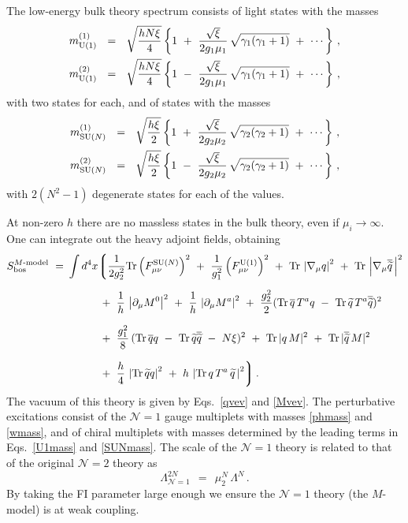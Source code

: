 \documentclass[12pt]{article}
\def\beq{\begin{equation}}
\def\eeq{\end{equation}}
\def\Tr{{\rm Tr}}
\newcommand{\ntwo}{${\mathcal N}=2$ }
\newcommand{\none}{${\mathcal N}=1$ }
\newcommand{\p}{\partial}
\newcommand{\wt}{\widetilde}
\newcommand{\ov}{\overline}
\newcommand{\mc}[1]{\mathcal{#1}}
\begin{document}
	The low-energy bulk theory spectrum consists of light states with the masses
\begin{align}
\label{U1mass}
%
\notag
	m_\text{U(1)}^{(1)}  ~~=~~ \sqrt{\frac{h N\xi}{4}}
		\left\{  1 ~+~ \frac{\sqrt{\xi}}{2g_1\mu_1}\,\sqrt{\gamma_1 (\gamma_1 + 1)} 
				~+~ \cdots \right\}\,,	
	\\
%
	m_\text{U(1)}^{(2)}  ~~=~~ \sqrt{\frac{h N\xi}{4}}
		\left\{  1 ~-~ \frac{\sqrt{\xi}}{2g_1\mu_1}\,\sqrt{\gamma_1 (\gamma_1 + 1)}
				~+~ \cdots \right\}\,,
\end{align}
	with two states for each, and of states with the masses
\begin{align}
\label{SUNmass}
%
\notag
	m_\text{SU($N$)}^{(1)} ~~=~~ \sqrt{\frac{h\xi}{2}}
		\left\{ 1 ~+~ \frac{\sqrt{\xi}}{2 g_2\mu_2}\,\sqrt{\gamma_2 (\gamma_2 + 1)}
				~+~ \cdots \right\}\,,
	\\
%
	m_\text{SU($N$)}^{(2)} ~~=~~ \sqrt{\frac{h\xi}{2}}
		\left\{ 1 ~-~ \frac{\sqrt{\xi}}{2 g_2\mu_2}\,\sqrt{\gamma_2 (\gamma_2 + 1)}
				~+~ \cdots \right\}\,,
\end{align}
	with $ 2 (N^2 - 1) $ degenerate states for each of the values.

	At non-zero $ h $ there are no massless states in the bulk theory, even
	if $ \mu_i \to \infty $.
	One can integrate out the heavy adjoint fields, obtaining
\begin{align}
\label{mmodel}
%
\notag
	S_{\rm bos}^\text{$M$-model} ~=~ & \int d^4 x 
		\biggl\lgroup
			\frac{1}{2g_2^2}\Tr \left(F_{\mu\nu}^\text{SU($N$)}\right)^2  ~+~
			\frac{1}{g_1^2} \left(F_{\mu\nu}^{\rm U(1)}\right)^2 ~+~ 
			\Tr\, \left| \nabla_\mu q \right|^2 ~+~ \Tr\,\left|\nabla_\mu \ov{\wt{q}}\, \right|^2 
			\\[2mm]
%
		&
\notag
			\phantom{\int d^4 x}
			~+~
			\frac{1}{h}\, \left| \p_\mu M^0 \right|^2  ~+~
			\frac{1}{h}\, \left| \p_\mu M^a \right|^2 ~+~
			\frac{g_2^2}{2} ( \Tr\, \ov{q}\, T^a q 
					~-~ \Tr\, \wt{q}\, T^a \ov{\wt{q}} )^2 
			\\[2mm]
%
\notag
		&
			\phantom{\int d^4 x}
			~+~
			\frac{g_1^2}{8}\, (\Tr\, \ov{q} q ~-~ \Tr\, \wt{q} \ov{\wt{q}} ~-~ N\xi )^2
			~+~
			\Tr\, |q\,M|^2 ~+~ \Tr\, |\ov{\wt{q}}\, M |^2
			\\[2mm]
%
		&
			\phantom{\int d^4 x}
			~+~
			\frac{h}{4}\, \left| \Tr\, \wt{q}q \right|^2  ~+~ 
			h\,\left| \Tr\, q\,T^a\,\wt{q} \,\right|^2
			\biggr\rgroup\,.	
\end{align}
	The vacuum of this theory is given by Eqs.~\eqref{qvev} and \eqref{Mvev}.
	The perturbative excitations consist of the \none gauge multiplets with masses
	\eqref{phmass} and \eqref{wmass}, and of chiral multiplets with masses determined by the 
	leading terms in Eqs.~\eqref{U1mass} and \eqref{SUNmass}.
	The scale of the \none theory is related to that of the original \ntwo theory as
\beq
	\Lambda_{\mc{N}=1}^{2N} ~~=~~ \mu_2^N\, \Lambda^N\,.
\label{Lambda}
\eeq
	By taking the FI parameter large enough we ensure the \none theory (the $M$-model) is at
	weak coupling.
	
\end{document}
